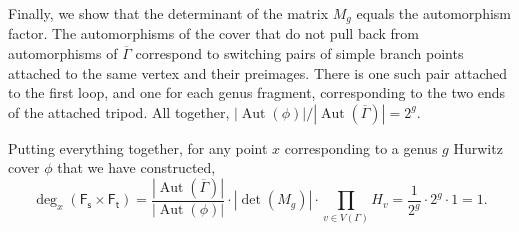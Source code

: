 \documentclass[11pt,reqno]{amsart}
\theoremstyle{definition}
\DeclareMathOperator{\Aut}{\mathrm Aut}
\newcommand{\Ft}{\mathsf{F_t}}
\newcommand{\Fs}{\mathsf{F_s}}
\begin{document}
Finally, we show that the determinant of the matrix $M_g$ equals the automorphism factor. 
The automorphisms of the cover that do not pull back from automorphisms of $\overline{\Gamma}$ correspond to switching pairs of simple branch points attached to the same vertex and their preimages. There is one such pair attached to the first loop, and one for each genus fragment, corresponding to the two ends of the attached tripod.
 All together, $|\Aut(\phi)|/|\Aut(\overline{\Gamma})|= 2^g$.

Putting everything together, for any point $x$  corresponding to a genus $g$ Hurwitz cover $\phi$ that we have constructed, 
\[
\deg_x(\Fs\times\Ft) =\frac{|\Aut(\overline{\Gamma})|}{|\Aut(\phi)|}\cdot|\det(M_g)|\cdot\prod_{v\in V(\Gamma)} H_v = \frac{1}{2^g}\cdot 2^g \cdot 1 = 1.
\]
\end{document}
